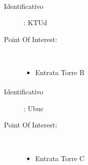 \documentclass[../SperimentazioniPratiche.tex]{subfiles}
\begin{document}
			\paragraph*{}
			\label{00001}
			\begin{tcolorbox}[fonttitle=\bfseries, 
								adjusted title={\Large Beacon 00001},
								sharp corners=south,
								colback=white, 
								colframe=white!50!blue!75!black]
								
				\begin{description}%
					\item[Identificativo]: KTUd

					\tcbline					
					
					\item[Point Of Interest:] \ \par
					\begin{itemize}
						\item Entrata Torre B
					\end{itemize}					   				
				\end{description}  				
			\end{tcolorbox}
			
			\paragraph*{}
			\label{00002}
			\begin{tcolorbox}[fonttitle=\bfseries, 
								adjusted title={\Large Beacon 00002},
								sharp corners=south,
								colback=white, 
								colframe=white!50!blue!75!black]
								
				\begin{description}%
					\item[Identificativo]: Ubuc

					\tcbline					
					
					\item[Point Of Interest:] \ \par
					\begin{itemize}
						\item Entrata Torre C
					\end{itemize}					   				
				\end{description}  				
			\end{tcolorbox}
			
\end{document}
